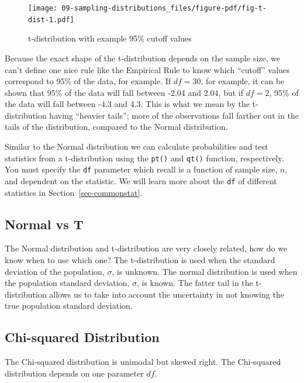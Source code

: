 \documentclass[
  letterpaper,
  DIV=11,
  numbers=noendperiod]{scrreprt}
\theoremstyle{definition}
\theoremstyle{remark}
\begin{document}
\begin{figure}

{\centering \texttt{[image: 09-sampling-distributions\_files/figure-pdf/fig-t-dist-1.pdf]}

}

\caption{\label{fig-t-dist}t-distribution with example 95\% cutoff
values}

\end{figure}

Because the exact shape of the t-distribution depends on the sample
size, we can't define one nice rule like the Empirical Rule to know
which ``cutoff'' values correspond to 95\% of the data, for example. If
\(df = 30\), for example, it can be shown that 95\% of the data will
fall between -2.04 and 2.04, but if \(df = 2\), 95\% of the data will
fall between -4.3 and 4.3. This is what we mean by the t-distribution
having ``heavier tails''; more of the observations fall farther out in
the tails of the distribution, compared to the Normal distribution.

Similar to the Normal distribution we can calculate probabilities and
test statistics from a t-distribution using the \texttt{pt()} and
\texttt{qt()} function, respectively. You must specify the \texttt{df}
parameter which recall is a function of sample size, \(n\), and
dependent on the statistic. We will learn more about the \texttt{df} of
different statistics in Section~\ref{sec-commonstat}.

\hypertarget{normal-vs-t}{%
\subsection{Normal vs T}\label{normal-vs-t}}

The Normal distribution and t-distribution are very closely related, how
do we know when to use which one? The t-distribution is used when the
standard deviation of the population, \(\sigma\), is unknown. The normal
distribution is used when the population standard deviation, \(\sigma\),
is known. The fatter tail in the t-distribution allows us to take into
account the uncertainty in not knowing the true population standard
deviation.

\hypertarget{chi-squared-distribution}{%
\subsection{Chi-squared Distribution}\label{chi-squared-distribution}}

The Chi-squared distribution is unimodal but skewed right. The
Chi-squared distribution depends on one parameter \(df\).
\end{document}
